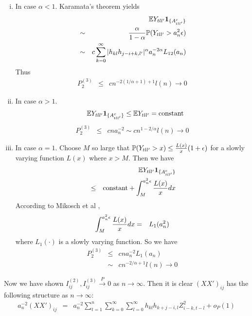 \documentclass{article}
\begin{document}
\begin{enumerate}[i)]
\item In case $\alpha < 1$. Karamata's theorem yields
  \begin{eqnarray*}
    && \mathbb{E} Y_{tll'}\mathbf{1}_{\{A^c_{tll'}\}} \\
    &\sim& {\alpha \over 1 -\alpha} \mathbb{P}(Y_{tll'} > a_n^2 \epsilon) \\
    &\sim& c \sum_{k=0}^\infty |h_{kl}h_{j-i+k,l'}|^{\alpha}
           a_n^{-2\alpha} L_{12}(a_n) \\
  \end{eqnarray*}
  Thus
  \begin{eqnarray*}
    P^{(3)}_2 &\leq& c n^{-2(1/\alpha + 1)+1}l(n) \to 0
  \end{eqnarray*}

\item In case $\alpha > 1$. 
  \begin{eqnarray*}
    && \mathbb{E} Y_{tll'} \mathbf{1}_{\{A^c_{tll'}\}} \leq \mathbb{E} Y_{tll'} = \text{constant}
  \end{eqnarray*}
  \begin{eqnarray*}
    P^{(3)}_2 &\leq& cna_n^{-2} \sim c n^{1-2/\alpha} l(n) \to 0
  \end{eqnarray*}
\item In case $\alpha=1$.
  Choose $M$ so large that $\mathbb{P}(Y_{tll'} > x) \leq {L(x) \over x}
  (1 + \epsilon)$ for a slowly varying function $L(x)$
  where $x > M$. Then we have
  \begin{eqnarray*}
    && \mathbb{E} Y_{tll'} \mathbf{1}_{\{A^c_{tll'}\}} \\
    &\leq& \text{constant} + \int_{M}^{a_n^2 \epsilon}
           {L(x) \over x} dx
  \end{eqnarray*}
  According to Mikosch et al \cite{Embrechts1997},
  \begin{eqnarray*}
    \int_{M}^{a_n^2 \epsilon}
    {L(x) \over x} dx &=& L_1(a_n^2)
  \end{eqnarray*}
  where $L_1(\cdot)$ is a slowly varying function. So we have
  \begin{eqnarray*}
    P^{(3)}_2 &\leq& c n a_n^{-2} L_1(a_n)\\
    &\sim& c n^{-2/\alpha + 1} l(n) \to 0
  \end{eqnarray*}
\end{enumerate}
Now we have shown $I^{(2)}_{ij}, I^{(3)}_{ij} \xrightarrow{P} 0$ as $n
\to \infty$. Then it is clear $(XX')_{ij}$ has the following structure
as $n \to \infty$:
\begin{eqnarray*}
  a_n^{-2}(XX')_{ij} &=& a_n^{-2} \sum_{t=1}^n \sum_{k=0}^\infty \sum_{l=0}^\infty
  h_{kl} h_{k+j-i,l} Z_{i-k, t-l}^2 + o_P(1)
\end{eqnarray*}
\end{document}
